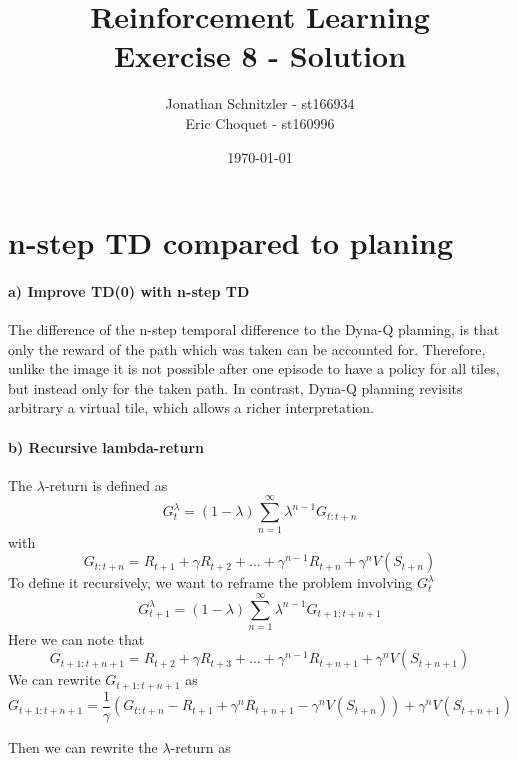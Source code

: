 \documentclass{article}
\title{Reinforcement Learning \\ Exercise 8 - Solution}
\author{Jonathan Schnitzler - st166934 \\
Eric Choquet - st160996}
\date{\today}
\begin{document}
\maketitle

\section{n-step TD compared to planing}

\paragraph*{a) Improve TD(0) with n-step TD}
The difference of the n-step temporal difference to the Dyna-Q planning, is that only the reward of the path which was taken can be accounted for. Therefore, unlike the image it is not possible after one episode to have a policy for all tiles, but instead only for the taken path. In contrast, Dyna-Q planning revisits arbitrary a virtual tile, which allows a richer interpretation.

\paragraph*{b) Recursive lambda-return}

The $\lambda$-return is defined as
\begin{equation}
    G_{t}^{\lambda} = (1-\lambda)\sum_{n=1}^{\infty}\lambda^{n-1}G_{t:t+n}
\end{equation}
with
\begin{equation}
    G_{t:t+n} = R_{t+1} + \gamma R_{t+2} + \ldots + \gamma^{n-1}R_{t+n} + \gamma^{n}V(S_{t+n})
\end{equation}
To define it recursively, we want to reframe the problem involving $G_t^{\lambda}$
\begin{equation}
    G_{t+1}^{\lambda} = (1-\lambda)\sum_{n=1}^{\infty}\lambda^{n-1}G_{t+1:t+n+1}
\end{equation}
Here we can note that
\begin{equation}
    G_{t+1:t+n+1} = R_{t+2} + \gamma R_{t+3} + \ldots + \gamma^{n-1}R_{t+n+1} + \gamma^{n}V(S_{t+n+1})
\end{equation}
We can rewrite $G_{t+1:t+n+1}$ as
\begin{equation}
    G_{t+1:t+n+1} = \frac{1}{\gamma}\left(G_{t:t+n} - R_{t+1} + \gamma^{n} R_{t+n+1} -\gamma^n V(S_{t+n})\right)+ \gamma^{n}V(S_{t+n+1})
\end{equation}

Then we can rewrite the $\lambda$-return as
\end{document}
